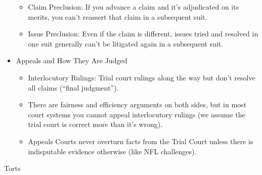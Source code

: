 \documentclass[
]{article}
\begin{document}
\begin{itemize}
  \begin{itemize}
  \item
    Claim Preclusion: If you advance a claim and it's adjudicated on its
    merits, you can't reassert that claim in a subsequent suit.
  \item
    Issue Preclusion: Even if the claim is different, issues tried and
    resolved in one suit generally can't be litigated again in a
    subsequent suit.
  \end{itemize}
\item
  Appeals and How They Are Judged

  \begin{itemize}
  \item
    Interlocutory Rulings: Trial court rulings along the way but don't
    resolve all claims (``final judgment'').
  \item
    There are fairness and efficiency arguments on both sides, but in
    most court systems you cannot appeal interlocutory rulings (we
    assume the trial court is correct more than it's wrong).
  \item
    Appeals Courts never overturn facts from the Trial Court unless
    there is indisputable evidence otherwise (like NFL challenges).
  \end{itemize}
\end{itemize}

Torts
\end{document}
